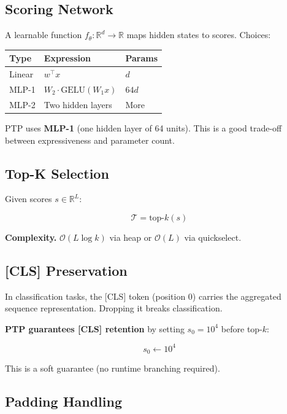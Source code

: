 {\subsection{Scoring Network}

A learnable function $f_\theta: \mathbb{R}^d \to \mathbb{R}$ maps hidden 
states to scores. Choices:

\begin{table}[H]
\centering
\small
\begin{tabular}{lll}
\toprule
\textbf{Type} & \textbf{Expression} & \textbf{Params} \\
\midrule
Linear & $w^\top x$ & $d$ \\
MLP-1 & $W_2 \cdot \text{GELU}(W_1 x)$ & $64 d$ \\
MLP-2 & Two hidden layers & More \\
\bottomrule
\end{tabular}
\end{table}

PTP uses \textbf{MLP-1} (one hidden layer of 64 units). This is a good 
trade-off between expressiveness and parameter count.

\subsection{Top-K Selection}

Given scores $s \in \mathbb{R}^L$:

\[
\mathcal{T} = \text{top-}k(s)
\tag{3.4}
\]

\textbf{Complexity.} $\mathcal{O}(L \log k)$ via heap or $\mathcal{O}(L)$ via 
quickselect.

\subsection{[CLS] Preservation}

In classification tasks, the [CLS] token (position 0) carries the 
aggregated sequence representation. Dropping it breaks classification.

\textbf{PTP guarantees [CLS] retention} by setting $s_0 = 10^4$ before top-$k$:

\[
s_0 \leftarrow 10^4
\tag{3.5}
\]

This is a soft guarantee (no runtime branching required).

\subsection{Padding Handling}

}
